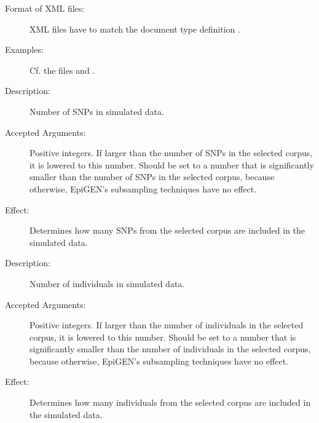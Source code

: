 \documentclass[a4paper,10pt,english]{sphinxhowto}
\begin{document}
\begin{description}
\begin{description}
\begin{description}
\item[{Format of XML files:}] \leavevmode
XML files have to match the document type definition .

\item[{Examples:}] \leavevmode
Cf. the files  and .

\end{description}

\item[{\sphinxcode{\sphinxupquote{-{-}snps SNPS}}:}] \leavevmode\begin{description}
\item[{Description:}] \leavevmode
Number of SNPs in simulated data.

\item[{Accepted Arguments:}] \leavevmode
Positive integers. If larger than the number of SNPs in the selected corpus, it is lowered to this number.
Should be set to a number that is significantly smaller than the number of SNPs in the selected corpus,
because otherwise, EpiGEN’s subsampling techniques have no effect.

\item[{Effect:}] \leavevmode
Determines how many SNPs from the selected corpus are included in the simulated data.

\end{description}

\item[{\sphinxcode{\sphinxupquote{-{-}inds INDS}}}] \leavevmode\begin{description}
\item[{Description:}] \leavevmode
Number of individuals in simulated data.

\item[{Accepted Arguments:}] \leavevmode
Positive integers. If larger than the number of individuals in the selected corpus, it is lowered to this number.
Should be set to a number that is significantly smaller than the number of individuals in the selected corpus,
because otherwise, EpiGEN’s subsampling techniques have no effect.

\item[{Effect:}] \leavevmode
Determines how many individuals from the selected corpus are included in the simulated data.

\end{description}


\end{description}
\end{description}
\end{document}
